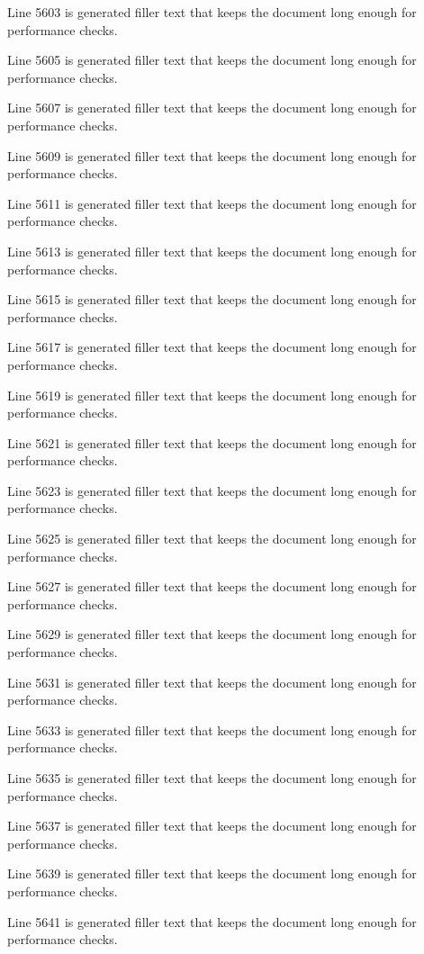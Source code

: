 Line 5603 is generated filler text that keeps the document long enough for performance checks.

Line 5605 is generated filler text that keeps the document long enough for performance checks.

Line 5607 is generated filler text that keeps the document long enough for performance checks.

Line 5609 is generated filler text that keeps the document long enough for performance checks.

Line 5611 is generated filler text that keeps the document long enough for performance checks.

Line 5613 is generated filler text that keeps the document long enough for performance checks.

Line 5615 is generated filler text that keeps the document long enough for performance checks.

Line 5617 is generated filler text that keeps the document long enough for performance checks.

Line 5619 is generated filler text that keeps the document long enough for performance checks.

Line 5621 is generated filler text that keeps the document long enough for performance checks.

Line 5623 is generated filler text that keeps the document long enough for performance checks.

Line 5625 is generated filler text that keeps the document long enough for performance checks.

Line 5627 is generated filler text that keeps the document long enough for performance checks.

Line 5629 is generated filler text that keeps the document long enough for performance checks.

Line 5631 is generated filler text that keeps the document long enough for performance checks.

Line 5633 is generated filler text that keeps the document long enough for performance checks.

Line 5635 is generated filler text that keeps the document long enough for performance checks.

Line 5637 is generated filler text that keeps the document long enough for performance checks.

Line 5639 is generated filler text that keeps the document long enough for performance checks.

Line 5641 is generated filler text that keeps the document long enough for performance checks.

